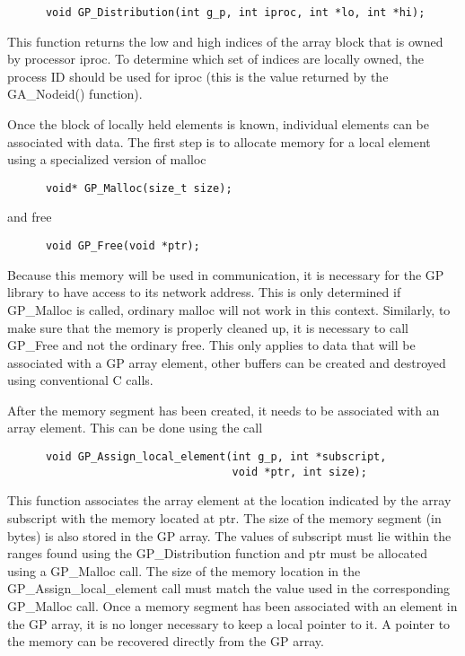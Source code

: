\begin{verbatim}
      void GP_Distribution(int g_p, int iproc, int *lo, int *hi);
\end{verbatim}

\noindent
This function returns the low and high indices of the array block that is owned
by processor iproc. To determine which set of indices are locally owned, the
process ID should be used for iproc (this is the value returned by the
GA\_Nodeid() function).

Once the block of locally held elements is known, individual elements can be
associated with data. The first step is to allocate memory for a local element
using a specialized version of malloc

\begin{verbatim}
      void* GP_Malloc(size_t size);
\end{verbatim}

\noindent
and free

\begin{verbatim}
      void GP_Free(void *ptr);
\end{verbatim}

\noindent
Because this memory will be used in communication, it is necessary for the GP
library to have access to its network address. This is only determined if
GP\_Malloc is called, ordinary malloc will not work in this context. Similarly,
to make sure that the memory is properly cleaned up, it is necessary to call
GP\_Free and not the ordinary free. This only applies to data that will be
associated with a GP array element, other buffers can be created and destroyed
using conventional C calls.

After the memory segment has been created, it needs to be associated with an
array element. This can be done using the call

\begin{verbatim}
      void GP_Assign_local_element(int g_p, int *subscript,
                                   void *ptr, int size);
\end{verbatim}

\noindent
This function associates the array element at the location indicated by the
array subscript with the memory located at ptr. The size of the memory segment
(in bytes) is also stored in the GP array. The values of subscript must lie
within the ranges found using the GP\_Distribution function and ptr must be
allocated using a GP\_Malloc call. The size of the memory location in the
GP\_Assign\_local\_element call must match the value used in the corresponding
GP\_Malloc call. Once a memory segment has been associated with an element in
the GP array, it is no longer necessary to keep a local pointer to it. A pointer
to the memory can be recovered directly from the GP array.

